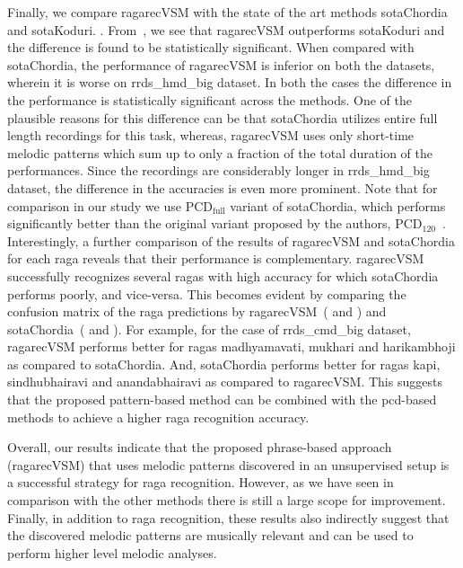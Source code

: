 Finally, we compare \acrshort{ragarecVSM} with the state of the art methods \acrshort{sotaChordia} and \acrshort{sotaKoduri}. .  From~, we see that \acrshort{ragarecVSM} outperforms \acrshort{sotaKoduri} and the difference is found to be statistically significant. When compared with \acrshort{sotaChordia}, the performance of \acrshort{ragarecVSM} is inferior on both the datasets, wherein it is worse on \acrshort{rrds_hmd_big} dataset. In both the cases the difference in the performance is statistically significant across the methods. One of the plausible reasons for this difference can be that \acrshort{sotaChordia} utilizes entire full length recordings for this task, whereas, \acrshort{ragarecVSM} uses only short-time melodic patterns which sum up to only a fraction of the total duration of the performances. Since the recordings are considerably longer in \acrshort{rrds_hmd_big} dataset, the difference in the accuracies is even more prominent. Note that for comparison in our study we use $\mathrm{PCD}_\mathrm{full}$  variant of \acrshort{sotaChordia}, which performs significantly better than the original variant proposed by the authors, $\mathrm{PCD}_{120}$~\citep{gulatiphrase_2016}. Interestingly, a further comparison of the results of \acrshort{ragarecVSM} and \acrshort{sotaChordia} for each \gls{raga} reveals that their performance is complementary. \acrshort{ragarecVSM} successfully recognizes several \glspl{raga} with high accuracy for which \acrshort{sotaChordia} performs poorly, and vice-versa. This becomes evident by comparing the confusion matrix of the \gls{raga} predictions by \acrshort{ragarecVSM}~( and ) and \acrshort{sotaChordia}~( and ). For example, for the case of \acrshort{rrds_cmd_big} dataset, \acrshort{ragarecVSM} performs better for \glspl{raga} \gls{madhyamavati}, \gls{mukhari} and \gls{harikambhoji} as compared to \acrshort{sotaChordia}. And,  \acrshort{sotaChordia} performs better for \glspl{raga} \gls{kapi}, \gls{sindhubhairavi} and \gls{anandabhairavi} as compared to \acrshort{ragarecVSM}. This suggests that the proposed pattern-based method can be combined with the \gls{pcd}-based methods to achieve a higher \gls{raga} recognition accuracy.

Overall, our results indicate that the proposed phrase-based approach (\acrshort{ragarecVSM}) that uses melodic patterns discovered in an unsupervised setup is a successful strategy for \gls{raga} recognition. However, as we have seen in comparison with the other methods there is still a large scope for improvement. Finally, in addition to \gls{raga} recognition, these results also indirectly suggest that the discovered melodic patterns are musically relevant and can be used to perform higher level melodic analyses. 



